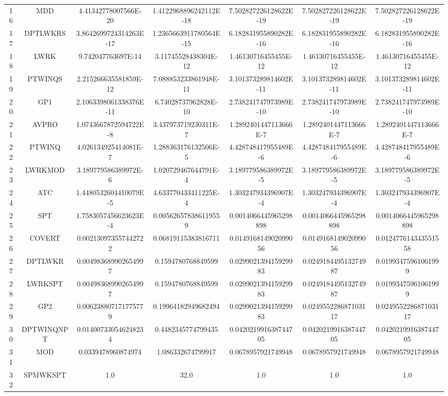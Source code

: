 \documentclass[a3paper,10pt]{article}
\begin{document}
\begin{table}[!htp]
\begin{tabular}{ccccccc}
16&MDD&4.41342778007566E-20&1.4122968896242112E-18&7.502827226128622E-19&7.502827226128622E-19&7.502827226128622E-19\\
17&DPTLWKRS&3.8642699724314263E-17&1.2365663911780564E-15&6.182831955890282E-16&6.182831955890282E-16&6.182831955890282E-16\\
18&LWRK&9.742047763697E-14&3.11745528438304E-12&1.46130716455455E-12&1.46130716455455E-12&1.46130716455455E-12\\
19&PTWINQS&2.215266635581859E-12&7.088853233861948E-11&3.101373289814602E-11&3.101373289814602E-11&3.101373289814602E-11\\
20&GP1&2.1063398061338376E-11&6.74028737962828E-10&2.738241747973989E-10&2.738241747973989E-10&2.738241747973989E-10\\
21&AVPRO&1.0743667872594722E-8&3.437973719230311E-7&1.2892401447113666E-7&1.2892401447113666E-7&1.2892401447113666E-7\\
22&PTWINQ&4.026134925414081E-7&1.288363176132506E-5&4.428748417955489E-6&4.428748417955489E-6&4.428748417955489E-6\\
23&LWRKMOD&3.189779586389972E-6&1.020729467644791E-4&3.189779586389972E-5&3.189779586389972E-5&3.189779586389972E-5\\
24&ATC&1.4480532604410079E-5&4.633770433411225E-4&1.303247934396907E-4&1.303247934396907E-4&1.303247934396907E-4\\
25&SPT&1.7583057456623623E-4&0.005626578386119559&0.0014066445965298898&0.0014066445965298898&0.0014066445965298898\\
26&COVERT&0.002130973557442722&0.06819115383816711&0.014916814902099056&0.014916814902099056&0.012477614343551558\\
27&DPTLWKR&0.004983689902654997&0.1594780768849599&0.029902139415929983&0.024918449513274987&0.01993475961061999\\
28&LWRKSPT&0.004983689902654997&0.1594780768849599&0.029902139415929983&0.024918449513274987&0.01993475961061999\\
29&GP2&0.006238807171775779&0.19964182949682494&0.029902139415929983&0.024955228687103117&0.024955228687103117\\
30&DPTWINQNPT&0.014007330546248234&0.4482345774799435&0.042021991638744705&0.042021991638744705&0.042021991638744705\\
31&MOD&0.0339478960874974&1.086332674799917&0.0678957921749948&0.0678957921749948&0.0678957921749948\\
32&SPMWKSPT&1.0&32.0&1.0&1.0&1.0\\
\hline
\end{tabular}
\end{table}
\end{document}
